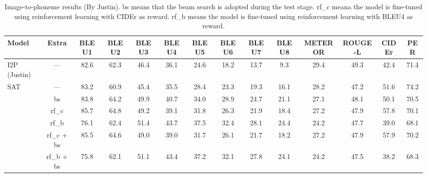\documentclass[journal,comsoc]{IEEEtran}
\begin{document}
\begin{table*}[htp]
\centering
\setlength{\tabcolsep}{1.2mm}
\caption{Image-to-phoneme results (By Justin). bs means that the beam search is adopted during the test stage. rf\_c meana the model is fine-tuned using reinforcement learning with CIDEr as reward. rf\_b means the model is fine-tuned using reinforcement learning with BLEU4 as reward.}
\label{tab:image2phone}
\begin{tabular}{l|c|cccccccccccc}
\hline
Model                                     & \multicolumn{1}{c|}{Extra} & \multicolumn{1}{c}{BLEU1} & \multicolumn{1}{c}{BLEU2} & \multicolumn{1}{c}{BLEU3} & \multicolumn{1}{c}{BLEU4} & \multicolumn{1}{c}{BLEU5} & \multicolumn{1}{c}{BLEU6} & \multicolumn{1}{c}{BLEU7} & \multicolumn{1}{c}{BLEU8} & \multicolumn{1}{c}{METEROR} & \multicolumn{1}{c}{ROUGE-L} & \multicolumn{1}{c}{CIDEr} & \multicolumn{1}{c}{PER}  \\ \hline
I2P (Justin)                                      & ---                               & \multicolumn{1}{c}{82.6}  & \multicolumn{1}{c}{62.3}  & \multicolumn{1}{c}{46.4}  & \multicolumn{1}{c}{36.1}  & \multicolumn{1}{c}{24.6}  & \multicolumn{1}{c}{18.2}  & \multicolumn{1}{c}{13.7}  & \multicolumn{1}{c}{9.3}   & \multicolumn{1}{c}{29.4}    & \multicolumn{1}{c}{49.3}    & \multicolumn{1}{c}{42.4}  & \multicolumn{1}{c}{71.4} \\ \hline
\multirow{6}{*}{SAT \cite{xu2015show}}  & ---      &   83.2   &   60.9   &   45.4   &   35.5   &   28.4   &   23.3   &   19.3   &   16.1   &   28.2   &   47.2   &   51.6   &   74.2   \\
                     & bs      &    83.8   &   64.2   &   49.9   &   40.7   &   34.0   &   28.9   &   24.7   &   21.1   &   27.1   &   48.1   &   50.1   &   70.5    \\
                      & rf\_c  &  85.7   &   64.8   &   49.2   &   39.1   &   31.8   &   26.3   &   21.9   &   18.4   &   27.2   &   47.9   &   57.8   &   70.1   \\
                      & rf\_b    &  76.1   &   62.4   &   51.4   &   43.7   &   37.5   &   32.4   &   28.1   &   24.4   &   24.2   &   47.7   &   39.0   &   68.1   \\
                     & rf\_c + bs   &   85.5   &   64.6   &   49.0   &   39.0   &   31.7   &   26.1   &   21.7   &   18.2   &   27.2   &   47.9   &   57.9   &   70.2   \\
                     & rf\_b + bs     &  75.8   &   62.1   &   51.1   &   43.4   &   37.2   &   32.1   &   27.8   &   24.1   &   24.2   &   47.5   &   38.2   &   68.3   \\ \hline

\end{tabular}
\end{table*}
\end{document}
